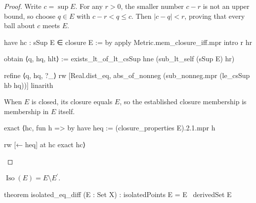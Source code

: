 \begin{proof}
  Write $c=\sup E$.
  For any $r>0$, the smaller number $c-r$ is not an upper bound, so choose $q\in E$ with $c-r<q\leq
    c$.
  Then $|c-q|<r$, proving that every ball about $c$ meets $E$.

  \begin{lean}
    have hc : sSup E ∈ closure E := by
      apply Metric.mem_closure_iff.mpr
      intro r hr

      obtain ⟨q, hq, hlt⟩ := exists_lt_of_lt_csSup hne (sub_lt_self (sSup E) hr)

      refine ⟨q, hq, ?_⟩
      rw [Real.dist_eq, abs_of_nonneg (sub_nonneg.mpr (le_csSup hb hq))]
      linarith
  \end{lean}

  When $E$ is closed, its closure equals $E$, so the established closure membership is membership
  in $E$ itself.

  \begin{lean}
    exact ⟨hc, fun h => by
      have heq := (closure_properties E).2.1.mpr h

      rw [← heq] at hc
      exact hc⟩
  \end{lean}

\end{proof}

\begin{proposition}
  \label{an1:thm:isolated-points-are-self-minus-limit-points}
  $\operatorname{Iso}(E)=E\setminus E^{\prime}$.

  \begin{lean}
    theorem isolated_eq_diff (E : Set X) : isolatedPoints E = E \ derivedSet E
  \end{lean}
\end{proposition}

